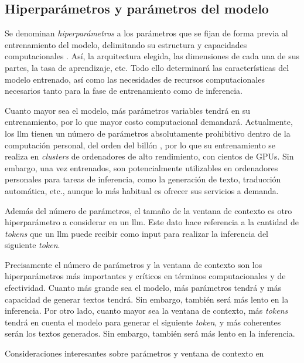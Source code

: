 \subsection{Hiperparámetros y parámetros del modelo}


Se denominan \emph{hiperparámetros} a los parámetros que se fijan de forma previa al entrenamiento del modelo, delimitando su estructura y capacidades computacionales \citep{QueEsAjuste}. Así, la arquitectura elegida, las dimensiones de cada una de sus partes, la tasa de aprendizaje, etc. Todo ello determinará las características del modelo entrenado, así como las necesidades de recursos computacionales necesarios tanto para la fase de entrenamiento como de inferencia.

Cuanto mayor sea el modelo, más parámetros variables tendrá en su entrenamiento, por lo que mayor costo computacional demandará. Actualmente, los \gls{llm} tienen un número de parámetros absolutamente prohibitivo dentro de la computación personal, del orden del billón \citep{radfordLanguageModelsAre2019}, por lo que su entrenamiento se realiza en \emph{clusters} de ordenadores de alto rendimiento, con cientos de GPUs. Sin embargo, una vez entrenados, son potencialmente utilizables en ordenadores personales para tareas de inferencia, como la generación de texto, traducción automática, etc., aunque lo más habitual es ofrecer sus servicios a demanda.

Además del número de parámetros, el tamaño de la ventana de contexto es otro hiperparámetro a considerar en un \gls{llm}. Este dato hace referencia a la cantidad de \emph{tokens} que un \gls{llm} puede recibir como input para realizar la inferencia del siguiente \emph{token}. 





Precisamente el número de parámetros y la ventana de contexto son los hiperparámetros más importantes y críticos en términos computacionales y de efectividad. Cuanto más grande sea el modelo, más parámetros tendrá y más capacidad de generar textos tendrá. Sin embargo, también será más lento en la inferencia. Por otro lado, cuanto mayor sea la ventana de contexto, más \emph{tokens} tendrá en cuenta el modelo para generar el siguiente \emph{token}, y más coherentes serán los textos generados. Sin embargo, también será más lento en la inferencia.


Consideraciones interesantes sobre parámetros y ventana de contexto en \cite{gonzaloAsomandonosVentanaContextual2023}

